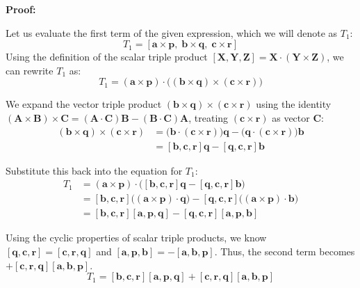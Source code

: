 \documentclass[12pt,a4paper]{article}
\begin{document}
\begin{enumerate}
\begin{tcolorbox}[enhanced,breakable,ansbox,colback=cD!4,colframe=cD,boxrule=0.8pt,arc=5pt,title={\textbf{Answer}},fonttitle=\bfseries\color{white},colbacktitle=cD]
\textbf{Proof:}

Let us evaluate the first term of the given expression, which we will denote as $T_1$:
\[ T_1 = [\mathbf{a}\times\mathbf{p},\;\mathbf{b}\times\mathbf{q},\;\mathbf{c}\times\mathbf{r}] \]
Using the definition of the scalar triple product $[\mathbf{X}, \mathbf{Y}, \mathbf{Z}] = \mathbf{X} \cdot (\mathbf{Y} \times \mathbf{Z})$, we can rewrite $T_1$ as:
\[ T_1 = (\mathbf{a}\times\mathbf{p}) \cdot \big( (\mathbf{b}\times\mathbf{q}) \times (\mathbf{c}\times\mathbf{r}) \big) \]

We expand the vector triple product $(\mathbf{b}\times\mathbf{q}) \times (\mathbf{c}\times\mathbf{r})$ using the identity $(\mathbf{A}\times\mathbf{B})\times\mathbf{C} = (\mathbf{A}\cdot\mathbf{C})\mathbf{B} - (\mathbf{B}\cdot\mathbf{C})\mathbf{A}$, treating $(\mathbf{c}\times\mathbf{r})$ as vector $\mathbf{C}$:
\begin{align*}
    (\mathbf{b}\times\mathbf{q}) \times (\mathbf{c}\times\mathbf{r}) &= \big( \mathbf{b} \cdot (\mathbf{c}\times\mathbf{r}) \big) \mathbf{q} - \big( \mathbf{q} \cdot (\mathbf{c}\times\mathbf{r}) \big) \mathbf{b} \\
    &= [\mathbf{b}, \mathbf{c}, \mathbf{r}]\mathbf{q} - [\mathbf{q}, \mathbf{c}, \mathbf{r}]\mathbf{b}
\end{align*}

Substitute this back into the equation for $T_1$:
\begin{align*}
    T_1 &= (\mathbf{a}\times\mathbf{p}) \cdot \big( [\mathbf{b}, \mathbf{c}, \mathbf{r}]\mathbf{q} - [\mathbf{q}, \mathbf{c}, \mathbf{r}]\mathbf{b} \big) \\
    &= [\mathbf{b}, \mathbf{c}, \mathbf{r}] \big( (\mathbf{a}\times\mathbf{p}) \cdot \mathbf{q} \big) - [\mathbf{q}, \mathbf{c}, \mathbf{r}] \big( (\mathbf{a}\times\mathbf{p}) \cdot \mathbf{b} \big) \\
    &= [\mathbf{b}, \mathbf{c}, \mathbf{r}][\mathbf{a}, \mathbf{p}, \mathbf{q}] - [\mathbf{q}, \mathbf{c}, \mathbf{r}][\mathbf{a}, \mathbf{p}, \mathbf{b}]
\end{align*}

Using the cyclic properties of scalar triple products, we know $[\mathbf{q}, \mathbf{c}, \mathbf{r}] = [\mathbf{c}, \mathbf{r}, \mathbf{q}]$ and $[\mathbf{a}, \mathbf{p}, \mathbf{b}] = -[\mathbf{a}, \mathbf{b}, \mathbf{p}]$. Thus, the second term becomes $+ [\mathbf{c}, \mathbf{r}, \mathbf{q}][\mathbf{a}, \mathbf{b}, \mathbf{p}]$.
\begin{equation}
    T_1 = [\mathbf{b}, \mathbf{c}, \mathbf{r}][\mathbf{a}, \mathbf{p}, \mathbf{q}] + [\mathbf{c}, \mathbf{r}, \mathbf{q}][\mathbf{a}, \mathbf{b}, \mathbf{p}]
\end{equation}


\end{tcolorbox}
\end{enumerate}
\end{document}
